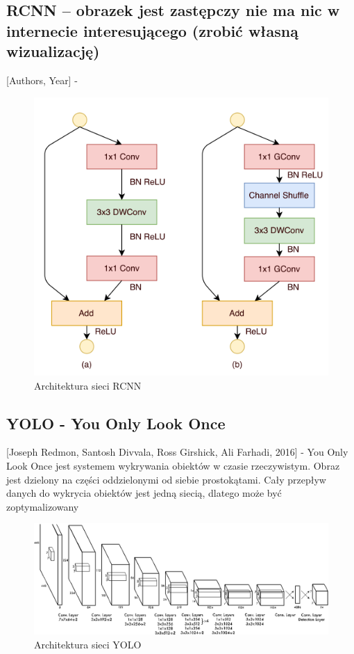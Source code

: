 \documentclass[12pt,a4paper,twoside,titlepage,openright]{book}
\begin{document}
\subsection{RCNN -- obrazek jest zastępczy nie ma nic w internecie interesującego (zrobić własną wizualizację)}
[Authors, Year] - \cite{DBLP:journals/corr/RenHG015}
\begin{figure}[h]
	\centering
			\includegraphics[resolution=120]{ResNeXt.png}
		\caption{Architektura sieci RCNN}
\end{figure}

\subsection{YOLO - You Only Look Once}
[Joseph Redmon, Santosh Divvala, Ross Girshick, Ali Farhadi, 2016] - You Only Look Once jest systemem wykrywania obiektów w czasie rzeczywistym. Obraz jest dzielony na części oddzielonymi od siebie prostokątami.
Cały przepływ danych do wykrycia obiektów jest jedną siecią, dlatego może być zoptymalizowany \cite{DBLP:journals/corr/RedmonDGF15}
\begin{figure}[h]
	\centering
			\includegraphics[resolution=100, scale=0.6]{YOLO.png}
		\caption{Architektura sieci YOLO}
\end{figure}
\end{document}
